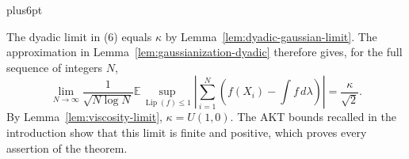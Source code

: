 \documentclass[11pt,reqno]{amsart}
\makeatletter
\def\section{\@startsection{section}{1}{0pt}%
  {20pt plus4pt minus4pt}
  {.5\linespacing}
  {\normalfont\bfseries}}
\theoremstyle{plain}
\theoremstyle{definition}
\theoremstyle{remark}
\renewenvironment{proof}[1][\proofname]{%
  \par
  \pushQED{\qed}%
  \normalfont
  \topsep6pt plus6pt\relax
  \trivlist
  \item[\hskip\labelsep\slshape #1\@addpunct{.}]%
  \ignorespaces
}{%
  \popQED
  \endtrivlist
  \@endpefalse
}
\DeclareRobustCommand{\qed}{%
  \leavevmode\unskip\penalty9999\hbox{}\nobreak
  \ifmmode
    \makebox[0pt][l]{\qquad\hbox{\qedsymbol}}%
  \else
    \qquad\hbox{\qedsymbol}%
  \fi
}
\renewcommand{\qedsymbol}{\rule[.47pt]{4pt}{6pt}}
\numberwithin{equation}{section}
\newcommand{\1}{\mathbf 1}
\newcommand{\Lip}{\operatorname{Lip}}
\makeatother
\begin{document}
\begin{samepage}
\begin{proof}[Proof of Theorem~\ref{thm:intro-main}]
The dyadic limit in (6) equals $\kappa$ by
Lemma~\ref{lem:dyadic-gaussian-limit}.  The approximation in
Lemma~\ref{lem:gaussianization-dyadic} therefore gives, for the full
sequence of integers $N$,
\begin{equation*}
\lim_ {N\to\infty}\frac1{\sqrt{N\log N}}
\mathbb E\sup_ {\Lip(f)\leq1}
\left|\sum_ {i=1}^N\left(f(X_ i)-\int f\,d\lambda\right)\right|
=\frac\kappa{\sqrt2}.
\end{equation*}
By Lemma~\ref{lem:viscosity-limit}, $\kappa=U(1,0)$.  The AKT bounds
recalled in the introduction show that this limit is finite and positive,
which proves every assertion of the theorem.

\end{proof}

\end{samepage}



\begingroup
\raggedright


\endgroup
\end{document}
